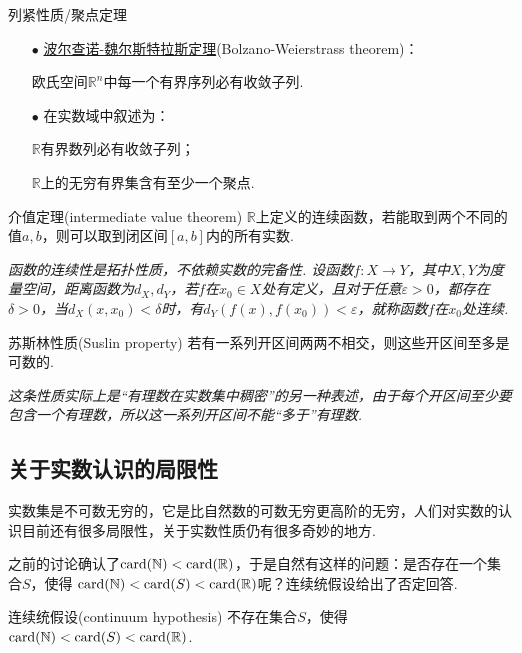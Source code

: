 \documentclass[main.tex]{subfiles}
\begin{document}
\begin{theorem}{列紧性质/聚点定理}
    \begin{itemize}
        \item [\(\bullet\)] \uline{波尔查诺-魏尔斯特拉斯定理}(Bolzano-Weierstrass theorem)：
        \par 欧氏空间\(\mathbb{R}^n\)中每一个有界序列必有收敛子列.
        \item [\(\bullet\)] 在实数域中叙述为：
        \par \(\mathbb{R}\)有界数列必有收敛子列；
        \par \(\mathbb{R}\)上的无穷有界集含有至少一个聚点.
    \end{itemize}
\end{theorem}

\begin{theorem}{介值定理(intermediate value theorem)}
    \(\mathbb{R}\)上定义的连续函数，若能取到两个不同的值\(a,b\)，则可以取到闭区间\([a,b]\)内的所有实数.
\end{theorem}

\textit{
    函数的连续性是拓扑性质，不依赖实数的完备性. 设函数\(f:X \to Y\)，其中\(X,Y\)为度量空间，距离函数为\(d_X,d_Y\)，若\(f\)在\(x_0 \in X\)处有定义，且对于任意\(\varepsilon > 0\)，都存在\(\delta > 0\)，当\(d_X(x,x_0)<\delta\)时，有\(d_Y(f(x),f(x_0))<\varepsilon\)，就称函数\(f\)在\(x_0\)处连续.
}

\begin{theorem}{苏斯林性质(Suslin property)}
    若有一系列开区间两两不相交，则这些开区间至多是可数的.
\end{theorem}

\textit{这条性质实际上是“有理数在实数集中稠密”的另一种表述，由于每个开区间至少要包含一个有理数，所以这一系列开区间不能“多于”有理数.}

\subsection{关于实数认识的局限性}

实数集是不可数无穷的，它是比自然数的可数无穷更高阶的无穷，人们对实数的认识目前还有很多局限性，关于实数性质仍有很多奇妙的地方.

之前的讨论确认了\({\rm card}(\mathbb{N})<{\rm card}(\mathbb{R})\)，于是自然有这样的问题：是否存在一个集合\(S\)，使得 \({\rm card}(\mathbb{N}) < {\rm card}(S) < {\rm card}(\mathbb{R})\)呢？连续统假设给出了否定回答.

\begin{proposition}{连续统假设(continuum hypothesis)}
    不存在集合\(S\)，使得\({\rm card}(\mathbb{N})<{\rm card}(S)<{\rm card}(\mathbb{R})\).
\end{proposition}
\end{document}
